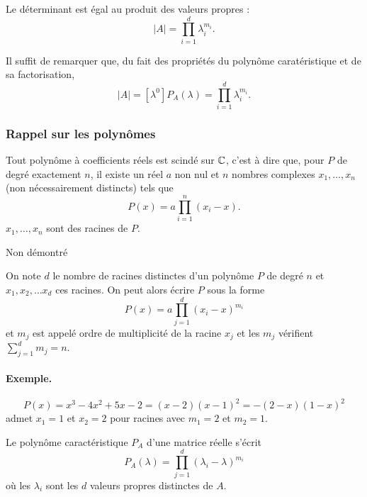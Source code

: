 \begin{corollary*}
  Le déterminant est égal au produit des valeurs propres : 
  $$
  |A| = \prod_{i=1}^d \lambda_i^{m_i}.
  $$
\end{corollary*}

\proof
  Il suffit de remarquer que, du fait des propriétés du polynôme caratéristique et de sa factorisation, 
  $$
  |A| = [\lambda^0]P_A(\lambda) = \prod_{i=1}^d \lambda_i^{m_i}.
  $$
\eproof

\subsubsection{Rappel sur les polynômes} 

\begin{proposition*}
  Tout polynôme à coefficients réels est scindé sur $\mathbb{C}$, c'est à dire que, pour $P$ de degré exactement $n$, il existe un réel $a$ non nul et $n$ nombres complexes $x_1, \dots, x_n$ (non nécessairement distincts) tels que
  $$
  P(x) = a \prod_{i=1}^n (x_i - x).
  $$
  $x_1, \dots, x_n$ sont des racines de $P$.
\end{proposition*}

\proof
Non démontré
\eproof

\begin{definition*}
  On note $d$ le nombre de racines distinctes d'un polynôme $P$ de degré $n$ et $x_1, x_2, \dots x_d$ ces racines. On peut alors écrire $P$ sous la forme
  $$
  P(x) = a \prod_{j=1}^d (x_i - x)^{m_i}
  $$
  et $m_j$ est appelé ordre de multiplicité de la racine $x_j$ et les $m_j$ vérifient $ \sum_{j=1}^d m_j = n$.
\end{definition*}

\paragraph{Exemple.} 
$$
P(x) = x^3 - 4x^2 + 5x - 2 = (x-2)(x-1)^2 = - (2-x)(1-x)^2
$$ 
admet $x_1 = 1$ et $x_2 = 2$ pour racines avec $m_1 = 2$ et $m_2 = 1$.


\begin{corollary*}
  Le polynôme caractéristique $P_A$ d'une matrice réelle s'écrit
  $$
  P_A(\lambda) = \prod_{j=1}^d (\lambda_i - \lambda)^{m_i}
  $$
  où les $\lambda_i$ sont les $d$ valeurs propres distinctes de $A$.
\end{corollary*}


